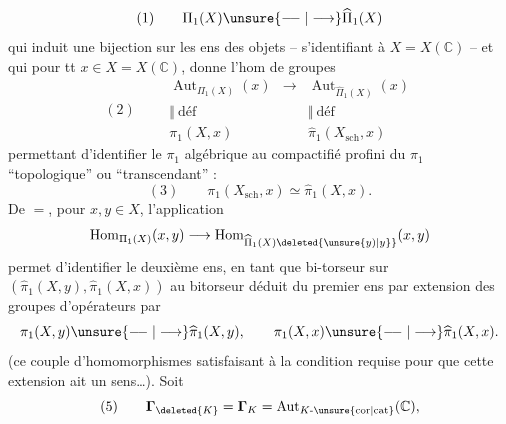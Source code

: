 \[
(1)\qquad\Pi_1(X)\unsure{\relbar\joinrel\relbar|\longrightarrow}\widehat\Pi_1(X)
\]
qui induit une bijection sur les ens des objets  -- s'identifiant à $X=X(\mathbb C)$ -- et qui  pour tt $x\in X=X(\mathbb C)$, donne l'hom de groupes
\[
(2)\qquad
\begin{array}{ccc}
\operatorname{Aut}_{\Pi_1(X)}(x)&\longrightarrow&\operatorname{Aut}_{\widehat\Pi_1(X)}(x)\\
\Vert\ \text{déf}&&\Vert\ \text{déf}\\
\pi_1(X,x)&&\widehat\pi_1(X_{\mathrm{sch}},x)
\end{array}
\]
permettant d'identifier le $\pi_1$ algébrique au compactifié profini du $\pi_1$ ``topologique'' ou ``transcendant'' : 
\[
(3)\qquad\pi_1(X_{\mathrm{sch}},x)\simeq\widehat\pi_1(X,x).
\]
De $=$, pour $x,y\in X$, l'application
\[
\operatorname{Hom}_{\Pi_1(X)}(x,y)\longrightarrow\operatorname{Hom}_{\widehat\Pi_1(X)\deleted{\unsure{y)|y}}}(x,y)
\]
permet d'identifier le deuxième ens, en tant que bi-torseur sur $(\widehat\pi_1(X,y),\widehat\pi_1(X,x))$ au bitorseur déduit  du premier ens par extension des groupes d'opérateurs par
\[
\pi_1(X,y)\unsure{\relbar\joinrel\relbar|\longrightarrow}\widehat\pi_1(X,y),\qquad\pi_1(X,x)\unsure{\relbar\joinrel\relbar|\longrightarrow}\widehat\pi_1(X,x).
\]
(ce couple d'homomorphismes satisfaisant  à la condition requise pour que cette extension ait un sens\ldots).
Soit
\[
(5)\qquad\mathbf{\Gamma}_{\deleted{K}}=\mathbf{\Gamma}_K=\operatorname{Aut}_{K\text{-}\unsure{\mathrm{cor}|\mathrm{cat}}}(\mathbb C),
\]



